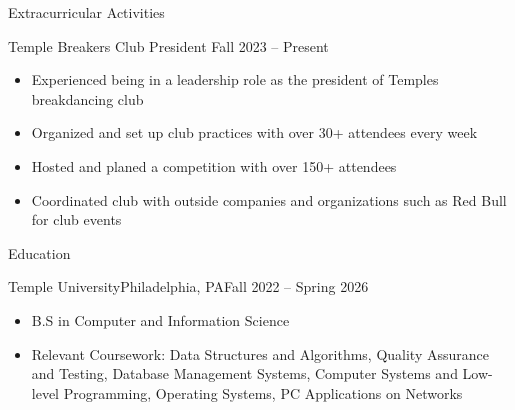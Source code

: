 \documentclass[]{mcdowellcv}
\begin{document}
	

	
	\begin{cvsection}{Extracurricular Activities}
		\begin{cvsubsection}{Temple Breakers Club President}{}{ Fall 2023 -- Present}	
			\begin{itemize}
				\item Experienced being in a leadership role as the president of Temples breakdancing club
				\item Organized and set up club practices with over 30+ attendees every week
				\item Hosted and planed a competition with over 150+ attendees
				\item Coordinated club with outside companies and organizations such as Red Bull for club events
			\end{itemize}
		\end{cvsubsection}
	\end{cvsection}



	
	

	\begin{cvsection}{Education}
		\begin{cvsubsection}{Temple University}{Philadelphia, PA}{Fall 2022 -- Spring 2026}
			\begin{itemize}
				\item B.S in Computer and Information Science
				\item Relevant Coursework: Data Structures and Algorithms, Quality Assurance and Testing, Database Management Systems, Computer Systems and Low-level Programming, Operating Systems, PC Applications on Networks
			\end{itemize}
		\end{cvsubsection}
	\end{cvsection}
	
\end{document}

